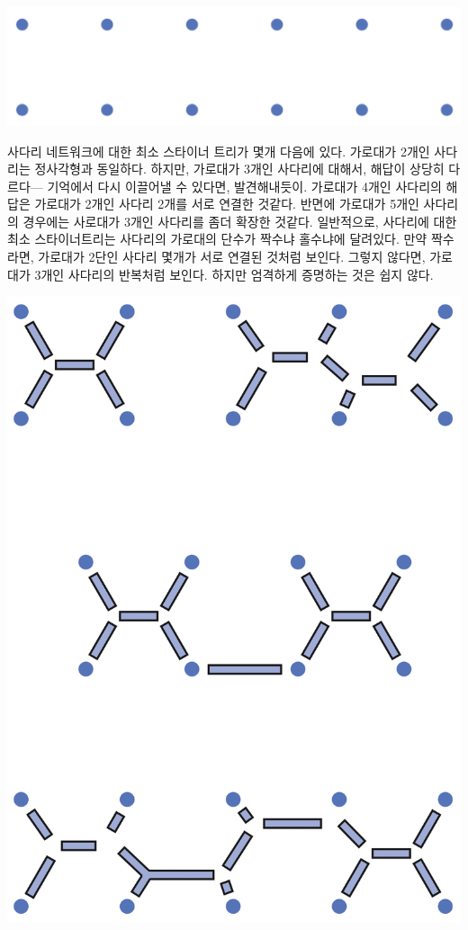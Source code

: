 \documentclass[]{article}
\begin{document}
\includegraphics{csunplugged/04-part/img/ch16-steiner/15-steiner-07-ladder-network.png}

사다리 네트워크에 대한 최소 스타이너 트리가 몇개 다음에 있다. 가로대가
2개인 사다리는 정사각형과 동일하다. 하지만, 가로대가 3개인 사다리에
대해서, 해답이 상당히 다르다--- 기억에서 다시 이끌어낼 수 있다면,
발견해내듯이. 가로대가 4개인 사다리의 해답은 가로대가 2개인 사다리 2개를
서로 연결한 것같다. 반면에 가로대가 5개인 사다리의 경우에는 사로대가
3개인 사다리를 좀더 확장한 것같다. 일반적으로, 사다리에 대한 최소
스타이너트리는 사다리의 가로대의 단수가 짝수냐 홀수냐에 달려있다. 만약
짝수라면, 가로대가 2단인 사다리 몇개가 서로 연결된 것처럼 보인다. 그렇지
않다면, 가로대가 3개인 사다리의 반복처럼 보인다. 하지만 엄격하게
증명하는 것은 쉽지 않다.

\includegraphics{csunplugged/04-part/img/ch16-steiner/15-steiner-08-minimal-steiner.png}
\end{document}
